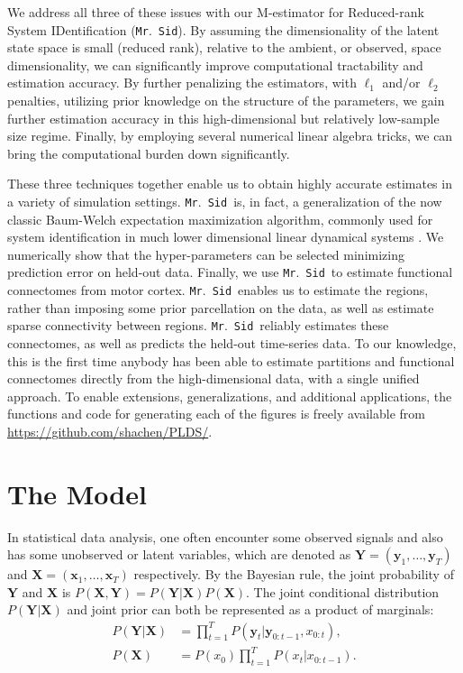 \documentclass[fleqn]{article}
\newcommand{\mrsid}{{\sc \texttt{Mr}.~\texttt{Sid}}}
\providecommand{\mb}[1]{\boldsymbol{#1}}
\newcommand{\bx}{\mb{x}}
\newcommand{\by}{\mb{y}}
\newcommand{\bX}{\mb{X}}
\newcommand{\bY}{\mb{Y}}
\begin{document}
We address all three of these issues with our M-estimator for Reduced-rank  System IDentification (\mrsid).  By assuming the dimensionality of the latent state space is small (reduced rank), relative to the ambient, or observed, space dimensionality, we can significantly improve computational tractability and estimation accuracy. By further penalizing the estimators, with $\ell_1$ and/or $\ell_2$ penalties, utilizing prior knowledge on the structure of the parameters, we gain further estimation accuracy in this high-dimensional but relatively low-sample size regime.  Finally, by employing several numerical linear algebra tricks, we can bring the computational burden down significantly.  

These three techniques together enable us to obtain highly accurate estimates in a variety of simulation settings.  \mrsid~is, in fact, a generalization of the now classic Baum-Welch expectation maximization algorithm, commonly used for system identification in much lower dimensional linear dynamical systems \cite{rabiner1989tutorial}. We numerically show that the hyper-parameters can be selected minimizing prediction error on held-out data.  Finally, we use \mrsid~to estimate functional connectomes from motor cortex.  \mrsid~enables us to estimate the regions, rather than imposing some prior parcellation on the data, as well as estimate sparse connectivity between regions.  \mrsid~reliably estimates these connectomes, as well as predicts the held-out time-series data.  To our knowledge, this is the first time anybody has been able to estimate partitions and functional connectomes directly from the high-dimensional data, with a single unified approach.  To enable extensions, generalizations, and additional applications, the functions and code for generating each of the figures is freely available from \url{https://github.com/shachen/PLDS/}.



\section{The Model}

In statistical data analysis, one often encounter some observed signals and also has some unobserved or latent variables, which are denoted as $\bY=(\by_1,\ldots,\by_T)$ and $\bX=(\bx_1,\ldots,\bx_T)$ respectively. By the Bayesian rule, the joint probability of $\bY$ and $\bX$ is $P(\bX,\bY)=P(\bY|\bX) P(\bX)$. The joint conditional distribution $P(\mb{Y}|\mb{X})$ and joint prior can both be represented as a product of marginals: 
\begin{equation}
\begin{aligned}
P(\mb{Y}|\mb{X}) &= \prod_{t=1}^T P(\by_t | \by_{0:t-1}, x_{0:t}), \\
P(\bX) &= P(x_0) \prod_{t=1}^T P(x_t | x_{0:t-1}).
\end{aligned}
\end{equation}
\end{document}
